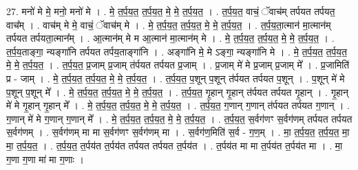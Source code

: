 \documentclass[17pt]{extarticle}
\begin{document}
27. मनो॑ मे मे॒ मनो॒ मनो॑ मे । . मे॒ त॒र्प॒य॒त॒ त॒र्प॒य॒त॒ मे॒ मे॒ त॒र्प॒य॒त॒ । . त॒र्प॒य॒त॒ वाचं॒ ॅवाच॑म् तर्पयत तर्पयत॒ वाच᳚म् । . वाच॑म् मे मे॒ वाचं॒ ॅवाच॑म् मे । . मे॒ त॒र्प॒य॒त॒ त॒र्प॒य॒त॒ मे॒ मे॒ त॒र्प॒य॒त॒ । . त॒र्प॒य॒ता॒त्मान॑ मा॒त्मान॑म् तर्पयत तर्पयता॒त्मान᳚म् । . आ॒त्मान॑म् मे म आ॒त्मान॑ मा॒त्मान॑म् मे । . मे॒ त॒र्प॒य॒त॒ त॒र्प॒य॒त॒ मे॒ मे॒ त॒र्प॒य॒त॒ । . त॒र्प॒य॒ताङ्गा॒ न्यङ्गा॑नि तर्पयत तर्पय॒ताङ्गा॑नि । . अङ्गा॑नि मे॒ मे ऽङ्गा॒ न्यङ्गा॑नि मे । . मे॒ त॒र्प॒य॒त॒ त॒र्प॒य॒त॒ मे॒ मे॒ त॒र्प॒य॒त॒ । . त॒र्प॒य॒त॒ प्र॒जाम् प्र॒जाम् त॑र्पयत तर्पयत प्र॒जाम् । . प्र॒जाम् मे॑ मे प्र॒जाम् प्र॒जाम् मे᳚ । . प्र॒जामिति॑ प्र - जाम् । . मे॒ त॒र्प॒य॒त॒ त॒र्प॒य॒त॒ मे॒ मे॒ त॒र्प॒य॒त॒ । . त॒र्प॒य॒त॒ प॒शून् प॒शून् त॑र्पयत तर्पयत प॒शून् । . प॒शून् मे॑ मे प॒शून् प॒शून् मे᳚ । . मे॒ त॒र्प॒य॒त॒ त॒र्प॒य॒त॒ मे॒ मे॒ त॒र्प॒य॒त॒ । . त॒र्प॒य॒त॒ गृ॒हान् गृ॒हान् त॑र्पयत तर्पयत गृ॒हान् । . गृ॒हान् मे॑ मे गृ॒हान् गृ॒हान् मे᳚ । . मे॒ त॒र्प॒य॒त॒ त॒र्प॒य॒त॒ मे॒ मे॒ त॒र्प॒य॒त॒ । . त॒र्प॒य॒त॒ ग॒णान् ग॒णान् त॑र्पयत तर्पयत ग॒णान् । . ग॒णान् मे॑ मे ग॒णान् ग॒णान् मे᳚ । . मे॒ त॒र्प॒य॒त॒ त॒र्प॒य॒त॒ मे॒ मे॒ त॒र्प॒य॒त॒ । . त॒र्प॒य॒त॒ स॒र्वग॑णꣳ स॒र्वग॑णम् तर्पयत तर्पयत स॒र्वग॑णम् । . स॒र्वग॑णम् मा मा स॒र्वग॑णꣳ स॒र्वग॑णम् मा । . स॒र्वग॑ण॒मिति॑ स॒र्व - ग॒ण॒म् । . मा॒ त॒र्प॒य॒त॒ त॒र्प॒य॒त॒ मा॒ मा॒ त॒र्प॒य॒त॒ । . त॒र्प॒य॒त॒ त॒र्पय॑त त॒र्पय॑त तर्पयत तर्पयत त॒र्पय॑त । . त॒र्पय॑त मा मा त॒र्पय॑त त॒र्पय॑त मा । . मा॒ ग॒णा ग॒णा मा॑ मा ग॒णाः । \newline
\end{document}
